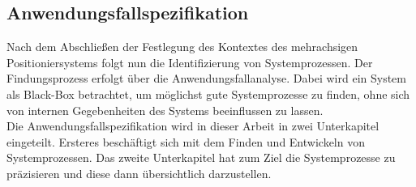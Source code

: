 \documentclass[../../../Bachelorarbeit.tex]{subfiles}
\begin{document}
\subsection{Anwendungsfallspezifikation} \label{AnwfallSpez}
Nach dem Abschließen der Festlegung des Kontextes des mehrachsigen Positioniersystems folgt nun die Identifizierung von Systemprozessen. Der Findungsprozess erfolgt über die Anwendungsfallanalyse. Dabei wird ein System als Black-Box betrachtet, um möglichst gute Systemprozesse zu finden, ohne sich von internen Gegebenheiten des Systems beeinflussen zu lassen.\\ %
Die Anwendungsfallspezifikation wird in dieser Arbeit in zwei Unterkapitel eingeteilt. Ersteres beschäftigt sich mit dem Finden und Entwickeln von Systemprozessen. Das zweite Unterkapitel hat zum Ziel die Systemprozesse zu präzisieren und diese dann übersichtlich darzustellen.\\
\end{document}
